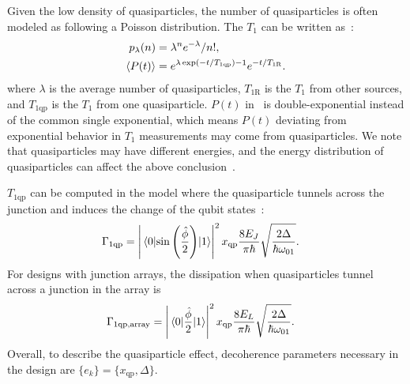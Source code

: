 \documentclass[a4paper,onecolumn,11pt,unpublished]{quantumarticle}
\newcommand{\setelem}[1]{\ensuremath{\{#1\}}}
\newcommand{\xqp}{x_{\text{qp}}}
\begin{document}
Given the low density of quasiparticles, the number of quasiparticles is often modeled as following a Poisson distribution. The $T_1$ can be written as~\cite{Pop2014Coherent}:
\begin{align}
  p_{\lambda}(n) & = \lambda^n e^{-\lambda} / n! , \label{eq:qp_poisson}                            \\
  \expval{P(t)}  & = e^{\lambda \exp(-t / T_{1\text{qp}})-1}e^{-t/T_{1\text{R}}}. \label{eq:t1_pt_qp}
\end{align}
where $\lambda$ is the average number of quasiparticles, $T_{1\text{R}}$ is the $T_1$ from other sources, and $T_{1\text{qp}}$ is the $T_1$ from one quasiparticle. $P(t)$ in~ is double-exponential instead of the common single exponential, which means $P(t)$ deviating from exponential behavior in $T_1$ measurements may come from quasiparticles. We note that quasiparticles may have different energies, and the energy distribution of quasiparticles can affect the above conclusion~\cite{Catelani2019Nonequilibrium,Vool2014NonPoissonian}.

$T_{1\text{qp}}$ can be computed in the model where the quasiparticle tunnels across the junction and induces the change of the qubit states~\cite{Catelani2011Quasiparticle,Catelani2011Relaxation}:
\begin{align}
  \Gamma_{1\text{qp}} & = \left|\mel{0}{\sin\left(\frac{\hat{\phi}}{2}\right)}{1}\right|^2 \xqp \frac{8E_J}{\pi\hbar}\sqrt{\frac{2\Delta}{\hbar \omega_{01}}}. \label{eq:t1_qp_junction}
\end{align}
For designs with junction arrays, the dissipation when quasiparticles tunnel across a junction in the array is~\cite{Catelani2011Quasiparticle}
\begin{align}
  \Gamma_{1\text{qp,array}} & = \left|\mel{0}{\frac{\hat{\phi}}{2}}{1}\right|^2 \xqp \frac{8E_L}{\pi\hbar}\sqrt{\frac{2\Delta}{\hbar \omega_{01}}}. \label{eq:t1_qp_array}
\end{align}
Overall, to describe the quasiparticle effect, decoherence parameters necessary in the design are $\setelem{e_k}=\setelem{\xqp, \Delta}$.
\end{document}
